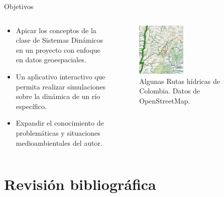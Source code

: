 \documentclass[17pt, t, lualatex]{beamer}
\begin{document}
\begin{frame}{Objetivos}

  \begin{columns}
    \begin{column}{.4\textwidth}
      \begin{itemize}
        \item Apicar los conceptos de la clase de Sistemas Dinámicos en un proyecto con enfoque en datos geoespaciales.
        \item Un aplicativo interactivo que permita realizar simulaciones sobre la dinámica de un río específico.
        \item Expandir el conocimiento de problemáticas y situaciones medioambientales del autor. 
      \end{itemize}

      
    \end{column}

    \begin{column}{.6\textwidth}
      \begin{figure}[ht]
        \centering
        \includegraphics[width=0.45\textwidth]{img/3.png}
        \caption{\label{fig:3} Algunas Rutas hídricas de Colombia. Datos de OpenStreetMap\cite{waterwaymap}.}
      \end{figure}

    \end{column}
  \end{columns}

\end{frame}

\section{Revisión bibliográfica}

\insertsectionpage
\end{document}
